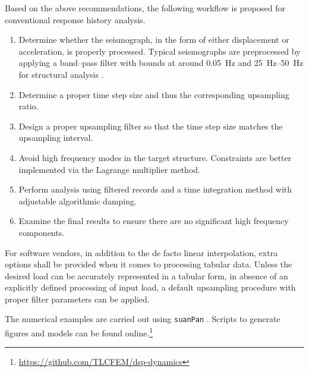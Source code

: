 Based on the above recommendations, the following workflow is proposed for conventional response history analysis.
\begin{enumerate}
\item Determine whether the seismograph, in the form of either displacement or acceleration, is properly processed. Typical seismographs are preprocessed by applying a band--pass filter with bounds at around \SI{0.05}{\hertz} and \SIrange{25}{50}{\hertz} for structural analysis \citep[see, e.g.,][]{Houtte2017}.
\item Determine a proper time step size and thus the corresponding upsampling ratio.
\item Design a proper upsampling filter so that the time step size matches the upsampling interval.
\item Avoid high frequency modes in the target structure. Constraints are better implemented via the Lagrange multiplier method.
\item Perform analysis using filtered records and a time integration method with adjustable algorithmic damping.
\item Examine the final results to ensure there are no significant high frequency components.
\end{enumerate}

For software vendors, in addition to the de facto linear interpolation, extra options shall be provided when it comes to processing tabular data. Unless the desired load can be accurately represented in a tabular form, in absence of an explicitly defined processing of input load, a default upsampling procedure with proper filter parameters can be applied.

The numerical examples are carried out using \texttt{suanPan} \citep{Chang2022}. Scripts to generate figures and models can be found online.\footnote{\url{https://github.com/TLCFEM/dsp-dynamics}}